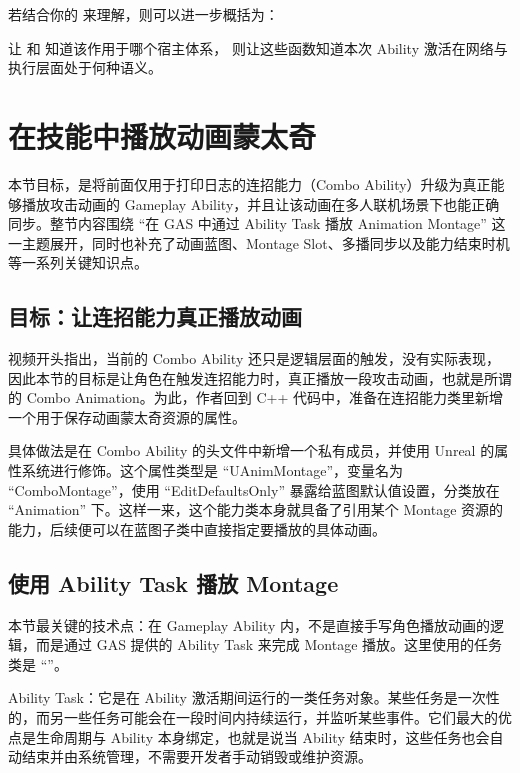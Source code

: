 若结合你的  来理解，则可以进一步概括为：

\begin{marker}
	 让  和  知道该作用于哪个宿主体系， 则让这些函数知道本次 Ability 激活在网络与执行层面处于何种语义。
\end{marker}



\section{在技能中播放动画蒙太奇}

本节目标，是将前面仅用于打印日志的连招能力（Combo Ability）升级为真正能够播放攻击动画的 Gameplay Ability，并且让该动画在多人联机场景下也能正确同步。整节内容围绕 ``在 GAS 中通过 Ability Task 播放 Animation Montage'' 这一主题展开，同时也补充了动画蓝图、Montage Slot、多播同步以及能力结束时机等一系列关键知识点。

\subsection{目标：让连招能力真正播放动画}

视频开头指出，当前的 Combo Ability 还只是逻辑层面的触发，没有实际表现，因此本节的目标是让角色在触发连招能力时，真正播放一段攻击动画，也就是所谓的 Combo Animation。为此，作者回到 C++ 代码中，准备在连招能力类里新增一个用于保存动画蒙太奇资源的属性。

具体做法是在 Combo Ability 的头文件中新增一个私有成员，并使用 Unreal 的属性系统进行修饰。这个属性类型是 ``UAnimMontage''，变量名为 ``ComboMontage''，使用 ``EditDefaultsOnly'' 暴露给蓝图默认值设置，分类放在 ``Animation'' 下。这样一来，这个能力类本身就具备了引用某个 Montage 资源的能力，后续便可以在蓝图子类中直接指定要播放的具体动画。

\subsection{使用 Ability Task 播放 Montage}
本节最关键的技术点：在 Gameplay Ability 内，不是直接手写角色播放动画的逻辑，而是通过 GAS 提供的 Ability Task 来完成 Montage 播放。这里使用的任务类是 ``''。

Ability Task：它是在 Ability 激活期间运行的一类任务对象。某些任务是一次性的，而另一些任务可能会在一段时间内持续运行，并监听某些事件。它们最大的优点是生命周期与 Ability 本身绑定，也就是说当 Ability 结束时，这些任务也会自动结束并由系统管理，不需要开发者手动销毁或维护资源。

